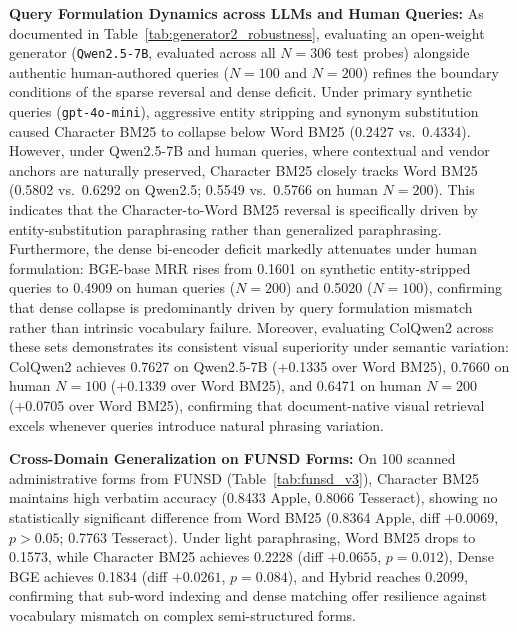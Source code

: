 \textbf{Query Formulation Dynamics across LLMs and Human Queries:} As documented in Table~\ref{tab:generator2_robustness}, evaluating an open-weight generator (\texttt{Qwen2.5-7B}, evaluated across all $N=306$ test probes) alongside authentic human-authored queries ($N=100$ and $N=200$) refines the boundary conditions of the sparse reversal and dense deficit. Under primary synthetic queries (\texttt{gpt-4o-mini}), aggressive entity stripping and synonym substitution caused Character BM25 to collapse below Word BM25 (0.2427 vs.\ 0.4334). However, under Qwen2.5-7B and human queries, where contextual and vendor anchors are naturally preserved, Character BM25 closely tracks Word BM25 (0.5802 vs.\ 0.6292 on Qwen2.5; 0.5549 vs.\ 0.5766 on human $N=200$). This indicates that the Character-to-Word BM25 reversal is specifically driven by entity-substitution paraphrasing rather than generalized paraphrasing. Furthermore, the dense bi-encoder deficit markedly attenuates under human formulation: BGE-base MRR rises from 0.1601 on synthetic entity-stripped queries to 0.4909 on human queries ($N=200$) and 0.5020 ($N=100$), confirming that dense collapse is predominantly driven by query formulation mismatch rather than intrinsic vocabulary failure. Moreover, evaluating ColQwen2 across these sets demonstrates its consistent visual superiority under semantic variation: ColQwen2 achieves 0.7627 on Qwen2.5-7B (+0.1335 over Word BM25), 0.7660 on human $N=100$ (+0.1339 over Word BM25), and 0.6471 on human $N=200$ (+0.0705 over Word BM25), confirming that document-native visual retrieval excels whenever queries introduce natural phrasing variation.

\textbf{Cross-Domain Generalization on FUNSD Forms:} On 100 scanned administrative forms from FUNSD \cite{jaume2019funsd} (Table~\ref{tab:funsd_v3}), Character BM25 maintains high verbatim accuracy (0.8433 Apple, 0.8066 Tesseract), showing no statistically significant difference from Word BM25 (0.8364 Apple, diff $+0.0069$, $p > 0.05$; 0.7763 Tesseract). Under light paraphrasing, Word BM25 drops to 0.1573, while Character BM25 achieves 0.2228 (diff $+0.0655$, $p = 0.012$), Dense BGE achieves 0.1834 (diff $+0.0261$, $p = 0.084$), and Hybrid reaches 0.2099, confirming that sub-word indexing and dense matching offer resilience against vocabulary mismatch on complex semi-structured forms.

